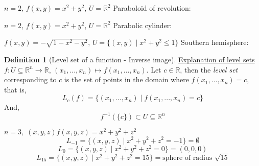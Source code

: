 \documentclass[12pt]{book}
\theoremstyle{definition}
\newtheorem{definition}{Definition}[section]
\theoremstyle{remark}
\begin{document}
  \begin{example}[i]
    $n =2$, $f(x,y) = x^2 + y^2$, $U = \mathbb{R}^2$
    \newline 
    Paraboloid of revolution:
    \newline

  \end{example}
  
  \begin{example}[ii]
    $n = 2$, $f(x,y) = x^2 + y^2$, $U = \mathbb{R}^2$
    \newline
    Parabolic cylinder:
    \newline
    
  \end{example}
  \begin{example}[iii]
    $f(x,y) = - \sqrt{1 - x^2 -y^2}$, $ U = \{ (x,y) \mid x^2+y^2 \leq 1 \} $
    \newline
    Southern hemisphere: 
    \newline 
    
  \end{example}

  \begin{definition}[Level set of a function - Inverse image]
    \href{https://mathinsight.org/level_sets#:~:text=For%20a%20function%20of%20three,x%2Cy%2Cz).}{Explanation of level sets}\newline 
    $f: U \subseteq \mathbb{R}^n \rightarrow \mathbb{R}$, $(x_1, ... , x_n) \mapsto f(x_1, ... , x_n)$. Let $c \in \mathbb{R}$, then the \textit{level set} corresponding to $c$ is the set of points in the domain where $f(x_1, ..., x_n) = c$, that is,
    $$ L_c (f) = \{ (x_1, ..., x_n) \mid f(x_1, ..., x_n) = c \} $$
    And,
    $$ f^{-1}(\{c\})\subset U \subseteq \mathbb{R}^n $$  
  \end{definition}
  \begin{example}[ii]
    $n =3, \; (x,y,z)f(x,y,z) = x^2 + y^2 +z^2$
    \newline
    $$L_{-1}= \{ (x,y,z) \mid x^2 +y^2 + z^2 = -1 \}= \emptyset$$
    $$L_0 =  \{ (x,y,z) \mid x^2 + y^2 + z^2 = 0 \} = (0,0,0)$$
    $$L_{15} =  \{ (x,y,z) \mid x^2 + y^2 + z^2 = 15 \} = \text{sphere of radius }\sqrt{15} $$ 
 \end{example} 
\end{document}
